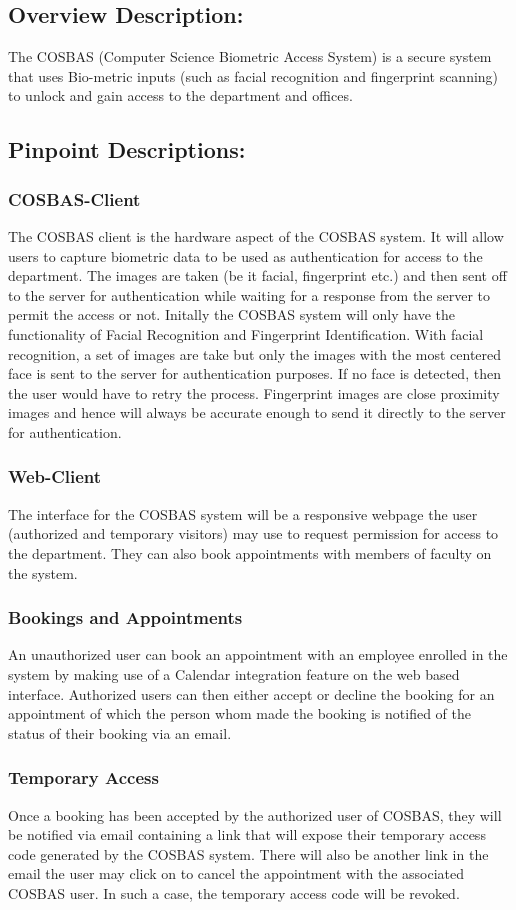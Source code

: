 \subsection{Overview Description:}
	The COSBAS (Computer Science Biometric Access System) is a secure system that uses Bio-metric inputs (such as facial recognition and fingerprint scanning) to unlock and gain access to the department and offices.
	
\subsection{Pinpoint Descriptions:}
	\subsubsection{COSBAS-Client}
	The COSBAS client is the hardware aspect of the COSBAS system. It will allow users to capture biometric data to be used as authentication for access to the department. The images are taken (be it facial, fingerprint etc.) and then sent off to the server for authentication while waiting for a response from the server to permit the access or not. Initally the COSBAS system will only have the functionality of Facial Recognition and Fingerprint Identification. With facial recognition, a set of images are take but only the images with the most centered face is sent to the server for authentication purposes. If no face is detected, then the user would have to retry the process. Fingerprint images are close proximity images and hence will always be accurate enough to send it directly to the server for authentication.
	
	\subsubsection{Web-Client}
	The interface for the COSBAS system will be a responsive webpage the user (authorized and temporary visitors) may use to request permission for access to the department. They can also book appointments with members of faculty on the system.
	
	\subsubsection{Bookings and Appointments}
	An unauthorized user can book an appointment with an employee enrolled in the system by making use of a Calendar integration feature on the web based interface. Authorized users can then either accept or decline the booking for an appointment of which the person whom made the booking is notified of the status of their booking via an email.
	
	\subsubsection{Temporary Access}
	Once a booking has been accepted by the authorized user of COSBAS, they will be notified via email containing a link that will expose their temporary access code generated by the COSBAS system. There will also be another link in the email the user may click on to cancel the appointment with the associated COSBAS user. In such a case, the temporary access code will be revoked.